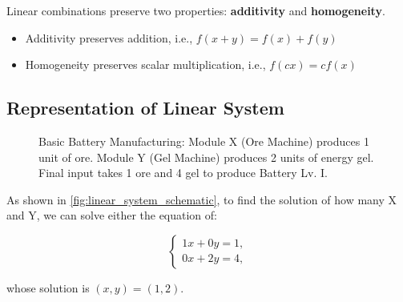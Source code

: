 \documentclass[11pt]{article}
\theoremstyle{definition}
\begin{document}
Linear combinations preserve two properties: \textbf{additivity} and \textbf{homogeneity}.

\begin{itemize}
    \item Additivity preserves addition, i.e., $f(x+y) = f(x) + f(y)$
    \item Homogeneity preserves scalar multiplication, i.e., $f(cx) = cf(x)$
\end{itemize}



\subsection{Representation of Linear System}

\begin{figure}[H]
\centering
{}
\caption{Basic Battery Manufacturing: Module X (Ore Machine) produces 1 unit of ore. Module Y (Gel Machine) produces 2 units of energy gel. Final input takes 1 ore and 4 gel to produce Battery Lv. I.}
\label{fig:linear_system_schematic}

\end{figure}

As shown in \autoref{fig:linear_system_schematic}, to find the solution of how many X and Y, we can solve either the equation of:

\[
\begin{cases}
    1x + 0y= 1,\\
    0x + 2y = 4,
\end{cases}
\]

whose solution is \((x,y)=(1,2)\).
\end{document}
